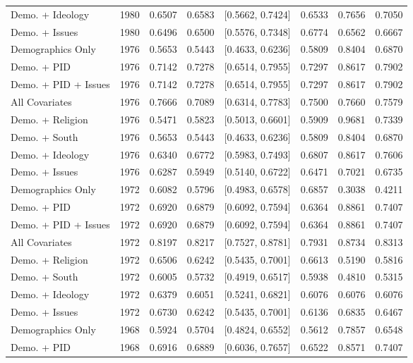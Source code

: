 \begin{longtable}{lrrrlrrr}
  Demo. + Ideology & 1980 & 0.6507 & 0.6583 & [0.5662, 0.7424] & 0.6533 & 0.7656 & 0.7050 \\ 
  Demo. + Issues & 1980 & 0.6496 & 0.6500 & [0.5576, 0.7348] & 0.6774 & 0.6562 & 0.6667 \\ 
  Demographics Only & 1976 & 0.5653 & 0.5443 & [0.4633, 0.6236] & 0.5809 & 0.8404 & 0.6870 \\ 
  Demo. + PID & 1976 & 0.7142 & 0.7278 & [0.6514, 0.7955] & 0.7297 & 0.8617 & 0.7902 \\ 
  Demo. + PID + Issues & 1976 & 0.7142 & 0.7278 & [0.6514, 0.7955] & 0.7297 & 0.8617 & 0.7902 \\ 
  All Covariates & 1976 & 0.7666 & 0.7089 & [0.6314, 0.7783] & 0.7500 & 0.7660 & 0.7579 \\ 
  Demo. + Religion & 1976 & 0.5471 & 0.5823 & [0.5013, 0.6601] & 0.5909 & 0.9681 & 0.7339 \\ 
  Demo. + South & 1976 & 0.5653 & 0.5443 & [0.4633, 0.6236] & 0.5809 & 0.8404 & 0.6870 \\ 
  Demo. + Ideology & 1976 & 0.6340 & 0.6772 & [0.5983, 0.7493] & 0.6807 & 0.8617 & 0.7606 \\ 
  Demo. + Issues & 1976 & 0.6287 & 0.5949 & [0.5140, 0.6722] & 0.6471 & 0.7021 & 0.6735 \\ 
  Demographics Only & 1972 & 0.6082 & 0.5796 & [0.4983, 0.6578] & 0.6857 & 0.3038 & 0.4211 \\ 
  Demo. + PID & 1972 & 0.6920 & 0.6879 & [0.6092, 0.7594] & 0.6364 & 0.8861 & 0.7407 \\ 
  Demo. + PID + Issues & 1972 & 0.6920 & 0.6879 & [0.6092, 0.7594] & 0.6364 & 0.8861 & 0.7407 \\ 
  All Covariates & 1972 & 0.8197 & 0.8217 & [0.7527, 0.8781] & 0.7931 & 0.8734 & 0.8313 \\ 
  Demo. + Religion & 1972 & 0.6506 & 0.6242 & [0.5435, 0.7001] & 0.6613 & 0.5190 & 0.5816 \\ 
  Demo. + South & 1972 & 0.6005 & 0.5732 & [0.4919, 0.6517] & 0.5938 & 0.4810 & 0.5315 \\ 
  Demo. + Ideology & 1972 & 0.6379 & 0.6051 & [0.5241, 0.6821] & 0.6076 & 0.6076 & 0.6076 \\ 
  Demo. + Issues & 1972 & 0.6730 & 0.6242 & [0.5435, 0.7001] & 0.6136 & 0.6835 & 0.6467 \\ 
  Demographics Only & 1968 & 0.5924 & 0.5704 & [0.4824, 0.6552] & 0.5612 & 0.7857 & 0.6548 \\ 
  Demo. + PID & 1968 & 0.6916 & 0.6889 & [0.6036, 0.7657] & 0.6522 & 0.8571 & 0.7407 \\ 

\end{longtable}
